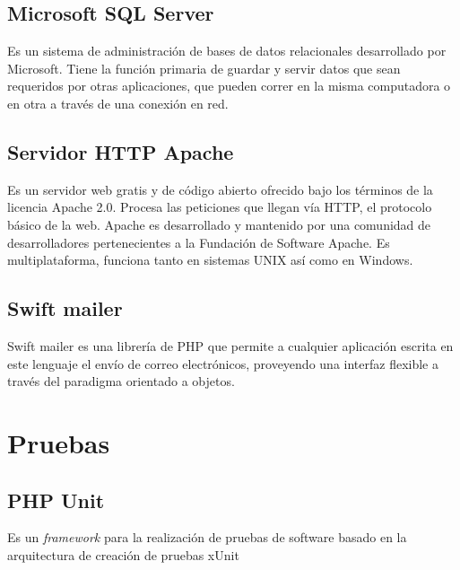 \subsection{Microsoft SQL Server}

Es un sistema de administración de bases de datos relacionales desarrollado por Microsoft. Tiene la función primaria de guardar y servir datos que sean requeridos por otras aplicaciones, que pueden correr en la misma computadora o en otra a través de una conexión en red.

\subsection{Servidor HTTP Apache}

Es un servidor web gratis y de código abierto ofrecido bajo los términos de la licencia Apache 2.0. Procesa las peticiones que llegan vía HTTP, el protocolo básico de la web. Apache es desarrollado y mantenido por una comunidad de desarrolladores pertenecientes a la Fundación de Software Apache. Es multiplataforma, funciona tanto en sistemas UNIX así como en Windows.

\subsection{Swift mailer}
Swift mailer es una librería de PHP que permite a cualquier aplicación escrita en este lenguaje el envío de correo electrónicos, proveyendo una interfaz flexible a través del paradigma orientado a objetos.

\section{Pruebas}

\subsection{PHP Unit}

Es un \emph{framework} para la realización de pruebas de software basado en la arquitectura de creación de pruebas xUnit




